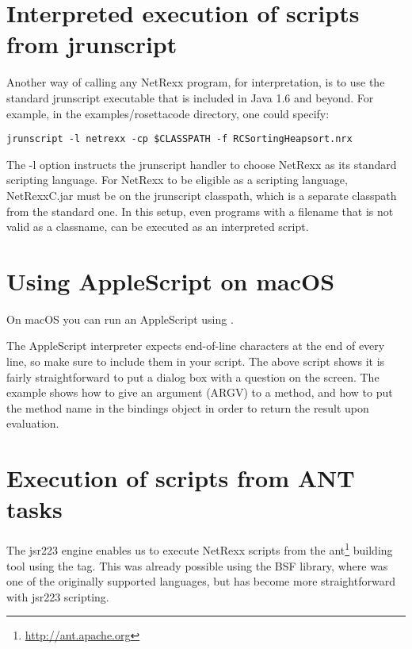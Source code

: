  \section{Interpreted execution of \nr{} scripts from jrunscript}
 Another way of calling any NetRexx program, for interpretation, is to use the standard jrunscript executable that is included in Java 1.6 and beyond. For example, in the examples/rosettacode directory, one could specify:
\begin{verbatim}
jrunscript -l netrexx -cp $CLASSPATH -f RCSortingHeapsort.nrx
\end{verbatim}
The -l option instructs the jrunscript handler to choose NetRexx as
its standard scripting language. For NetRexx to be eligible as a
scripting language, NetRexxC.jar must be on the jrunscript classpath,
which is a separate classpath from the standard one. In this setup,
even \nr{} programs with a filename that is not valid as a classname,
can be executed as an interpreted script.

% 


\section{Using AppleScript on macOS}
On macOS you can run an AppleScript using \nr{}. 

 The AppleScript interpreter expects end-of-line characters at the end
 of every line, so make sure to include them in your script. The above
 script shows it is fairly straightforward to put a dialog box with a
 question on the screen. The example shows how to give an argument
 (ARGV) to a method, and how to put the method name in the bindings
 object in order to return the result upon evaluation. 
 
\section{Execution of \nr{} scripts from ANT tasks}
The jsr223 engine enables us to execute NetRexx scripts from the
ant\footnote{\url{http://ant.apache.org}} building tool using the
 tag. This was already possible using the BSF library,
where \nr{} was one of the originally supported languages,
but has become more straightforward with jsr223 scripting.


